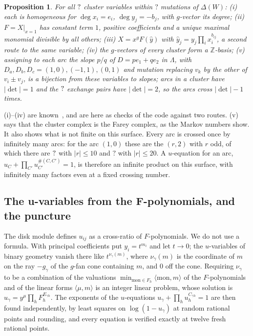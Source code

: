\documentclass[11pt,a4paper]{article}
\newcommand{\SSSfDepth}{?}\newcommand{\SSSfTriples}{?}\newcommand{\SSSfLinkDepth}{?}
\newcommand{\SSSfCrossTwenty}{?}
\newcommand{\ZZ}{\mathbb{Z}}
\newcommand{\Lam}{\Lambda}
\theoremstyle{plain}
\newtheorem{proposition}{Proposition}
\theoremstyle{definition}
\begin{document}
\begin{proposition}
\label{prop:surf-F}
For all $?$ cluster variables within $\SSSfDepth$ mutations of $\Delta(W)$:
(i) each is homogeneous for $\deg x_i=e_i$, $\deg y_j=-b_j$, with $g$-vector its degree;
(ii) $F=X|_{x=1}$ has constant term $1$, positive coefficients and a unique maximal monomial divisible by all others;
(iii) $X=x^{g}F(\hat y)$ with $\hat y_j=y_j\prod_ix_i^{b_{ij}}$, a second route to the same variable;
(iv) the $g$-vectors of every cluster form a $\ZZ$-basis;
(v) assigning to each arc the slope $p/q$ of $D=pe_1+qe_2$ in $\Lam$, with $D_a,D_b,D_c=(1,0),(-1,1),(0,1)$ and mutation replacing $v_k$ by the other of $v_i\pm v_j$, is a bijection
from these variables to slopes; arcs in a cluster have $|\det|=1$ and the $?$ exchange pairs have $|\det|=2$, so the arcs cross $|\det|-1$ times.
\end{proposition}

(i)--(iv) are known~\cite{FST,MSW}, and are here as checks of the code against two routes. (v) says that the cluster complex is the Farey complex, as the Markov numbers show. It also shows what is not
finite on this surface. Every arc is crossed once by infinitely many arcs: for the arc $(1,0)$ these are the $(r,2)$ with $r$ odd, of which there are $?$ with $|r|\le10$ and $\SSSfCrossTwenty$ with $|r|\le20$.
A $u$-equation for an arc, $u_C+\prod_{C'}u_{C'}^{\#(C,C')}=1$, is therefore an infinite product on this surface, with infinitely many factors even at a fixed crossing number.

\subsection{The u-variables from the F-polynomials, and the puncture}
\label{sec:surf-u}

The disk module defines $u_{ij}$ as a cross-ratio of $F$-polynomials. We do not use a formula. With principal coefficients put $y_i=t^{m_i}$ and let $t\to0$; the
$u$-variables of binary geometry vanish there like $t^{\nu_\gamma(m)}$, where $\nu_\gamma(m)$ is the coordinate of $m$ on the ray $-g_\gamma$ of the $g$-fan cone containing $m$,
and $0$ off the cone. Requiring $\nu_\gamma$ to be a combination of the valuations $\min_{\mathrm{mon}\in F_h}\langle\mathrm{mon},m\rangle$ of the $F$-polynomials and of the linear forms $\langle\mu,m\rangle$
is an integer linear problem, whose solution is $u_\gamma=y^{\mu}\prod_hF_h^{E_{\gamma h}}$. The exponents of the $u$-equations
$u_\gamma+\prod_{h}u_h^{C_{\gamma h}}=1$ are then found independently, by least squares on $\log(1-u_\gamma)$ at random rational points and rounding, and every equation is
verified exactly at twelve fresh rational points.
\end{document}
